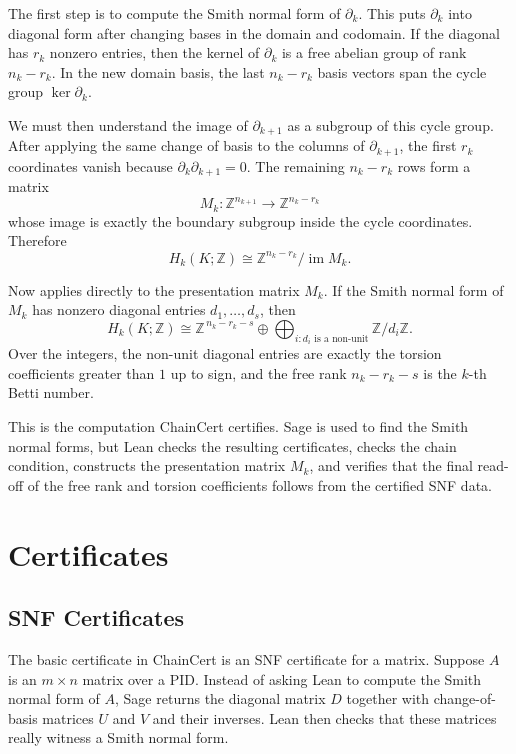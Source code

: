 \documentclass[11pt]{article}
\theoremstyle{plain}
\theoremstyle{definition}
\theoremstyle{remark}
\begin{document}
The first step is to compute the Smith normal form of $\partial_k$. This puts
$\partial_k$ into diagonal form after changing bases in the domain and codomain.
If the diagonal has $r_k$ nonzero entries, then the kernel of $\partial_k$ is a
free abelian group of rank $n_k-r_k$. In the new domain basis, the last
$n_k-r_k$ basis vectors span the cycle group $\ker\partial_k$.

We must then understand the image of $\partial_{k+1}$ as a subgroup of this
cycle group. After applying the same change of basis to the columns of
$\partial_{k+1}$, the first $r_k$ coordinates vanish because
$\partial_k\partial_{k+1}=0$. The remaining $n_k-r_k$ rows form a matrix
\[
    M_k : \mathbb{Z}^{n_{k+1}} \to \mathbb{Z}^{n_k-r_k}
\]
whose image is exactly the boundary subgroup inside the cycle coordinates.
Therefore
\[
    H_k(K;\mathbb{Z})
      \cong \mathbb{Z}^{n_k-r_k} / \operatorname{im} M_k.
\]

Now  applies directly to the presentation matrix $M_k$.
If the Smith normal form of $M_k$ has nonzero diagonal entries
$d_1,\ldots,d_s$, then
\[
    H_k(K;\mathbb{Z})
      \cong \mathbb{Z}^{\,n_k-r_k-s}
          \oplus \bigoplus_{i : d_i \text{ is a non-unit}} \mathbb{Z}/d_i\mathbb{Z}.
\]
Over the integers, the non-unit diagonal entries are exactly the torsion
coefficients greater than $1$ up to sign, and the free rank
$n_k-r_k-s$ is the $k$-th Betti number.

This is the computation ChainCert certifies. Sage is used to find the Smith
normal forms, but Lean checks the resulting certificates, checks the chain
condition, constructs the presentation matrix $M_k$, and verifies that the final
read-off of the free rank and torsion coefficients follows from the certified
SNF data.

\section{Certificates}\label{sec:certificates}
\subsection{SNF Certificates}

The basic certificate in ChainCert is an SNF certificate for a matrix. Suppose
$A$ is an $m\times n$ matrix over a PID. Instead of asking Lean to compute the
Smith normal form of $A$, Sage returns the diagonal matrix $D$ together with
change-of-basis matrices $U$ and $V$ and their inverses. Lean then checks that
these matrices really witness a Smith normal form.
\end{document}
